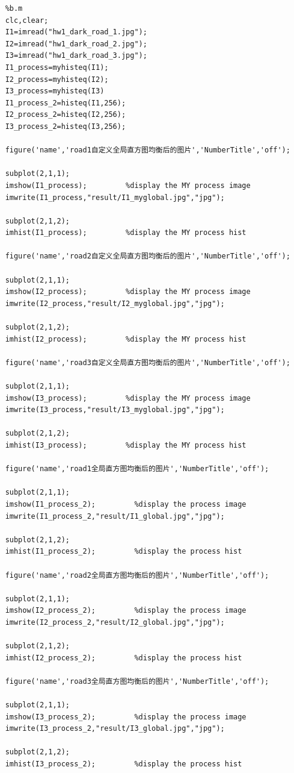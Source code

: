 \documentclass[
	12pt, %
]{fphw}
\begin{document}
\begin{lstlisting}
	%b.m
	clc,clear;
	I1=imread("hw1_dark_road_1.jpg");
	I2=imread("hw1_dark_road_2.jpg");
	I3=imread("hw1_dark_road_3.jpg");
	I1_process=myhisteq(I1);
	I2_process=myhisteq(I2);
	I3_process=myhisteq(I3)
	I1_process_2=histeq(I1,256);
	I2_process_2=histeq(I2,256);
	I3_process_2=histeq(I3,256);

	figure('name','road1自定义全局直方图均衡后的图片','NumberTitle','off');

	subplot(2,1,1);
	imshow(I1_process);         %display the MY process image
	imwrite(I1_process,"result/I1_myglobal.jpg","jpg");
			
	subplot(2,1,2);
	imhist(I1_process);         %display the MY process hist

	figure('name','road2自定义全局直方图均衡后的图片','NumberTitle','off');

	subplot(2,1,1);
	imshow(I2_process);         %display the MY process image
	imwrite(I2_process,"result/I2_myglobal.jpg","jpg");
			
	subplot(2,1,2);
	imhist(I2_process);         %display the MY process hist

	figure('name','road3自定义全局直方图均衡后的图片','NumberTitle','off');

	subplot(2,1,1);
	imshow(I3_process);         %display the MY process image
	imwrite(I3_process,"result/I3_myglobal.jpg","jpg");
			
	subplot(2,1,2);
	imhist(I3_process);         %display the MY process hist

	figure('name','road1全局直方图均衡后的图片','NumberTitle','off');

	subplot(2,1,1);
	imshow(I1_process_2);         %display the process image
	imwrite(I1_process_2,"result/I1_global.jpg","jpg");
			
	subplot(2,1,2);
	imhist(I1_process_2);         %display the process hist

	figure('name','road2全局直方图均衡后的图片','NumberTitle','off');

	subplot(2,1,1);
	imshow(I2_process_2);         %display the process image
	imwrite(I2_process_2,"result/I2_global.jpg","jpg");
			
	subplot(2,1,2);
	imhist(I2_process_2);         %display the process hist

	figure('name','road3全局直方图均衡后的图片','NumberTitle','off');

	subplot(2,1,1);
	imshow(I3_process_2);         %display the process image
	imwrite(I3_process_2,"result/I3_global.jpg","jpg");
			
	subplot(2,1,2);
	imhist(I3_process_2);         %display the process hist

\end{lstlisting}
\end{document}
